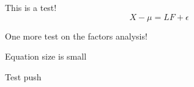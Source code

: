 This is a test!
\begin{equation*}
X - \mu = L F + \epsilon
\end{equation*}

One more test on the factors analysis!

Equation size is small

Test push
